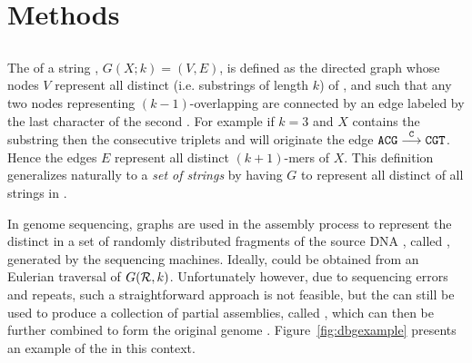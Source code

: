 \chapter{Methods}



\section{}
\label{sec:dBG}


The  of a string , $G(X;k)=(V,E)$, is defined as the directed graph whose nodes $V$ represent all distinct  (i.e. substrings of length $k$) of , and such that any two nodes representing $(k-1)$-overlapping  are connected by an edge labeled by the last character of the second \kmer. For example if $k=3$ and $X$ contains the substring  then the consecutive triplets  and  will originate the edge $\mathtt{ACG}\stackrel{\mathtt{C}}{\longrightarrow}\mathtt{CGT}$. Hence the edges $E$ represent all distinct $(k+1)$-mers of $X$. 
This definition generalizes naturally to a \emph{set of strings}  by having $G$ to represent all distinct  of all strings in .

In genome sequencing, \dB graphs are used in the assembly process to represent the distinct  in a set \readset of randomly distributed fragments of the source DNA , called , generated by the sequencing machines. Ideally,  could be obtained from an Eulerian traversal of $G(\readset, k)$. Unfortunately however, due to sequencing errors and repeats, such a straightforward approach is not feasible, but the \dBG can still be used to produce a collection of partial assemblies, called , which can then be further combined to form the original genome \cite{Pevzner2001}. Figure~\ref{fig:dbgexample} presents an example of the \dBG in this context.

